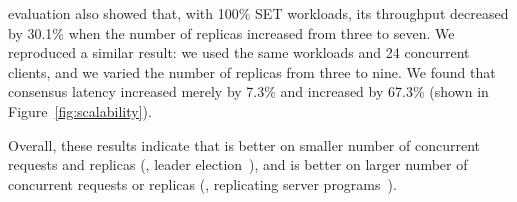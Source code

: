 \dare evaluation also showed that, with 100\% SET workloads, its throughput 
decreased by 30.1\% when the number of replicas increased from three to seven. 
We reproduced a similar result: we used the same workloads and 24 concurrent 
clients, and we varied the number of replicas from three to nine. We found 
that \xxx consensus latency increased merely by 7.3\% and \dare increased by 
67.3\% (shown in Figure~\ref{fig:scalability}).

Overall, these results indicate that \dare is better on smaller number of 
concurrent requests and replicas (\eg, 
leader election~\cite{chubby:osdi,zookeeper}), and \xxx is better on larger 
number of concurrent requests or replicas (\eg, replicating server 
programs~\cite{rex:eurosys14,crane:sosp15}).


% 



